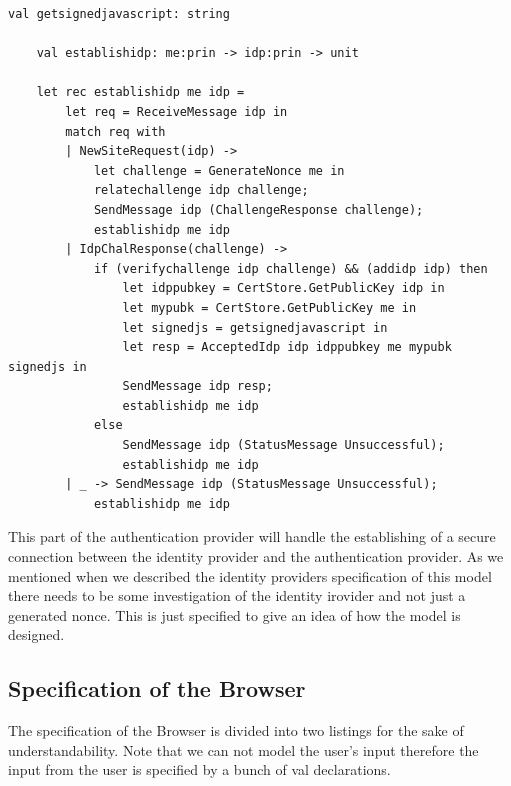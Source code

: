 \documentclass[twosided]{report}
\begin{document}
\begin{lstlisting}[style=fstar, caption={Established a secure connection with the Identity Provider}]
	val getsignedjavascript: string

	val establishidp: me:prin -> idp:prin -> unit

	let rec establishidp me idp =
		let req = ReceiveMessage idp in
		match req with
		| NewSiteRequest(idp) ->
			let challenge = GenerateNonce me in
			relatechallenge idp challenge;
			SendMessage idp (ChallengeResponse challenge);
			establishidp me idp
		| IdpChalResponse(challenge) ->
			if (verifychallenge idp challenge) && (addidp idp) then
				let idppubkey = CertStore.GetPublicKey idp in
				let mypubk = CertStore.GetPublicKey me in
				let signedjs = getsignedjavascript in
				let resp = AcceptedIdp idp idppubkey me mypubk signedjs in
				SendMessage idp resp;
				establishidp me idp
			else
				SendMessage idp (StatusMessage Unsuccessful);
				establishidp me idp
		| _ -> SendMessage idp (StatusMessage Unsuccessful);
			establishidp me idp
\end{lstlisting}

This part of the authentication provider will handle the establishing of a secure connection between the identity provider and the authentication provider. As we mentioned when we described the identity providers specification of this model there needs to be some investigation of the identity irovider and not just a generated nonce. This is just specified to give an idea of how the model is designed.

\subsection{Specification of the Browser}
The specification of the Browser is divided into two listings for the sake of understandability. Note that we can not model the user's input therefore the input from the user is specified by a bunch of val declarations.
\end{document}

